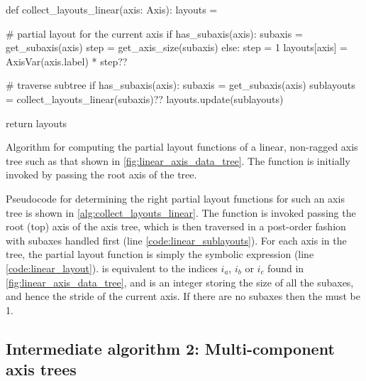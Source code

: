 \documentclass[thesis]{subfiles}
\begin{document}
\begin{algorithm}
  \begin{center}
    \begin{minipage}{.9\textwidth}
      \begin{pyalg2}
        def collect_layouts_linear(axis: Axis):
          layouts = {}

          # partial layout for the current axis
          if has_subaxis(axis):
            subaxis = get_subaxis(axis)
            step = get_axis_size(subaxis)
          else:
            step = 1
          layouts[axis] = AxisVar(axis.label) * step?\label{code:linear_layout}?

          # traverse subtree
          if has_subaxis(axis): 
            subaxis = get_subaxis(axis)
            sublayouts = collect_layouts_linear(subaxis)?\label{code:linear_sublayouts}?
            layouts.update(sublayouts)

          return layouts
      \end{pyalg2}
    \end{minipage}
  \end{center}

  \caption{
    Algorithm for computing the partial layout functions of a linear, non-ragged axis tree such as that shown in \cref{fig:linear_axis_data_tree}.
    The function is initially invoked by passing the root axis of the tree.
  }
  \label{alg:collect_layouts_linear}
\end{algorithm}

Pseudocode for determining the right partial layout functions for such an axis tree is shown in \cref{alg:collect_layouts_linear}.
The function  is invoked passing the root (top) axis of the axis tree, which is then traversed in a post-order fashion with subaxes handled first (line \ref{code:linear_sublayouts}).
For each axis in the tree, the partial layout function is simply the symbolic expression  (line \ref{code:linear_layout}).
 is equivalent to the indices $i_a$, $i_b$ or $i_c$ found in \cref{fig:linear_axis_data_tree}, and  is an integer storing the size of all the subaxes, and hence the stride of the current axis.
If there are no subaxes then the  must be 1.

\subsection{Intermediate algorithm 2: Multi-component axis trees}
\label{sec:layout_alg_multi_component}
\end{document}
